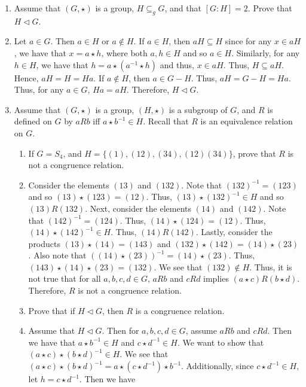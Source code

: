 \documentclass[12pt]{article}
\makeatletter
\theoremstyle{definition}
\theoremstyle{remark}
\renewenvironment{proof}[1][\proofname]{\par
  \pushQED{\qed}%
  \normalfont \topsep6\p@\@plus6\p@\relax
  \list{}{\leftmargin=0mm
          \rightmargin=4mm
          \settowidth{\itemindent}{\itshape#1}%
          \labelwidth=\itemindent
          \parsep=0pt \listparindent=\parindent 
  }
  \item[\hskip\labelsep
        \itshape
    #1\@addpunct{.}]\ignorespaces
}{%
  \popQED\endlist\@endpefalse
}
\let\oldproofname=\proofname
\renewcommand{\proofname}{\bf{\textit{\oldproofname}}}
\makeatother
\begin{document}
\begin{enumerate}[leftmargin=*]
    \item Assume that $(G,\star)$ is a group, $H\subseteq_g G$, and that $[G\colon H]=2$. Prove that $H\triangleleft G$.
        \begin{proof}
           Let $a\in G$. Then $a\in H$ or $a\notin H$. If $a\in H$, then $aH\subseteq H$ since for any $x\in aH$, we have that $x=a\star h$, where both $a,h\in H$ and so $a\in H$. Similarly, for any $h\in H$, we have that $h=a\star(a^{-1}\star h)$ and thus, $x\in aH$. Thus, $H\subseteq aH$. Hence, $aH=H=Ha$. If $a\notin H$, then $a\in G-H$. Thus, $aH=G-H=Ha$. Thus, for any $a\in G$, $Ha=aH$. Therefore, $H\triangleleft G$.      
        \end{proof}
        
    \item Assume that $(G,\star)$ is a group, $(H,\star)$ is a subgroup of $G$, and $R$ is defined on $G$ by $aRb$ iff $a\star b^{-1}\in H$. Recall that $R$ is an equivalence relation on $G$.
        \begin{enumerate}[label=(\alph*)]
            \item If $G=S_4$, and $H=\{(1),(12),(34),(12)(34)\}$, prove that $R$ is not a congruence relation.
                \begin{proof}
                    Consider the elements $(13)$ and $(132)$. Note that $(132)^{-1}=(123)$ and so $(13)\star(123)=(12)$. Thus, $(13)\star(132)^{-1}\in H$ and so $(13)R(132)$. Next, consider the elements $(14)$ and $(142)$. Note that $(142)^{-1}=(124)$. Thus, $(14)\star(124)=(12)$. Thus, $(14)\star(142)^{-1}\in H$. Thus, $(14)R(142)$. Lastly, consider the products $(13)\star(14)=(143)$ and $(132)\star(142)=(14)\star(23)$. Also note that $((14)\star(23))^{-1}=(14)\star(23)$. Thus, $(143)\star(14)\star(23)=(132)$. We see that $(132)\notin H$. Thus, it is not true that for all $a,b,c,d\in G$, $aRb$ and $cRd$ implies $(a\star c)R(b\star d)$. Therefore, $R$ is not a congruence relation.
                \end{proof}
                
            \item Prove that if $H\triangleleft G$, then $R$ is a congruence relation.
                \begin{proof}
                    Assume that $H\triangleleft G$. Then for $a,b,c,d\in G$, assume $aRb$ and $cRd$. Then we have that $a\star b^{-1}\in H$ and $c\star d^{-1}\in H$. We want to show that $(a\star c)\star(b\star d)^{-1}\in H$. We see that $(a\star c)\star(b\star d)^{-1}=a\star(c\star d^{-1})\star b^{-1}$. Additionally, since $c\star d^{-1}\in H$, let $h=c\star d^{-1}$. Then we have 
                    

\end{proof}
\end{enumerate}
\end{enumerate}
\end{document}
